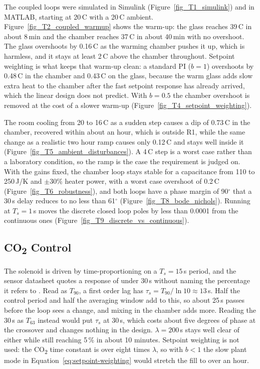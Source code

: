The coupled loops were simulated in Simulink (Figure~\ref{fig_T1_simulink}) and in MATLAB, starting at 20\,\textdegree{}C with a 20\,\textdegree{}C ambient. Figure~\ref{fig_T2_coupled_warmup} shows the warm-up: the glass reaches 39\,\textdegree{}C in about 8\,min and the chamber reaches 37\,\textdegree{}C in about 40\,min with no overshoot. The glass overshoots by 0.16\,\textdegree{}C as the warming chamber pushes it up, which is harmless, and it stays at least 2\,\textdegree{}C above the chamber throughout. Setpoint weighting is what keeps that warm-up clean: a standard PI ($b = 1$) overshoots by 0.48\,\textdegree{}C in the chamber and 0.43\,\textdegree{}C on the glass, because the warm glass adds slow extra heat to the chamber after the fast setpoint response has already arrived, which the linear design does not predict. With $b = 0.5$ the chamber overshoot is removed at the cost of a slower warm-up (Figure~\ref{fig_T4_setpoint_weighting}).

The room cooling from 20 to 16\,\textdegree{}C as a sudden step causes a dip of 0.73\,\textdegree{}C in the chamber, recovered within about an hour, which is outside R1, while the same change as a realistic two hour ramp causes only 0.12\,\textdegree{}C and stays well inside it (Figure~\ref{fig_T5_ambient_disturbances}). A 4\,\textdegree{}C step is a worst case rather than a laboratory condition, so the ramp is the case the requirement is judged on. With the gains fixed, the chamber loop stays stable for a capacitance from 110 to 250\,J/K and $\pm30$\% heater power, with a worst case overshoot of 0.2\,\textdegree{}C (Figure~\ref{fig_T6_robustness}), and both loops have a phase margin of 90$^\circ$ that a 30\,s delay reduces to no less than 61$^\circ$ (Figure~\ref{fig_T8_bode_nichols}). Running at $T_s = 1$\,s moves the discrete closed loop poles by less than 0.0001 from the continuous ones (Figure~\ref{fig_T9_discrete_vs_continuous}).

\subsection{CO\textsubscript{2} Control}
\label{subsec:co2-control}


The solenoid is driven by time-proportioning on a $T_s = 15$\,s period, and the sensor datasheet quotes a response of under 30\,s without naming the percentage it refers to \citep{gss_explorir_m}. Read as $T_{90}$, a first order lag has $\tau_s = T_{90}/\ln 10 \approx 13$\,s. Half the control period and half the averaging window add to this, so about 25\,s passes before the loop sees a change, and mixing in the chamber adds more. Reading the 30\,s as $T_{63}$ instead would put $\tau_s$ at 30\,s, which costs about five degrees of phase at the crossover and changes nothing in the design. $\lambda = 200$\,s stays well clear of either while still reaching 5\,\% in about 10 minutes. Setpoint weighting is not used: the CO\textsubscript{2} time constant is over eight times $\lambda$, so with $b < 1$ the slow plant mode in Equation~\ref{eq:setpoint-weighting} would stretch the fill to over an hour.

